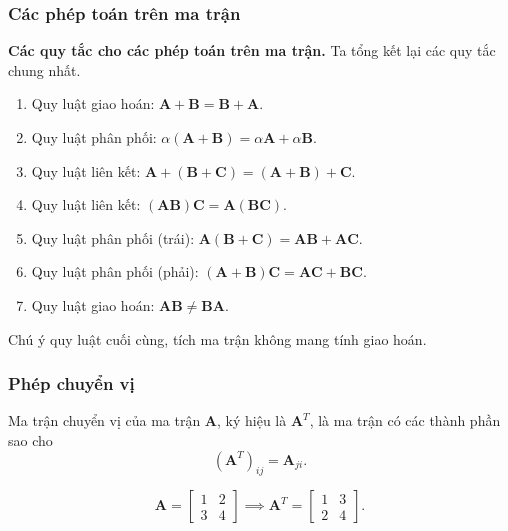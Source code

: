 \begin{frame}
    \frametitle{Các phép toán trên ma trận}
    \textbf{Các quy tắc cho các phép toán trên ma trận.} Ta tổng kết lại các quy tắc chung nhất.
    \begin{enumerate}
    \item Quy luật giao hoán: \(\mathbf{A}+\mathbf{B}=\mathbf{B}+\mathbf{A}\).
    \item Quy luật phân phối: \(\alpha(\mathbf{A}+\mathbf{B})=\alpha\mathbf{A}+\alpha\mathbf{B}\).
    \item Quy luật liên kết: \(\mathbf{A}+(\mathbf{B}+\mathbf{C})=(\mathbf{A}+\mathbf{B})+\mathbf{C}\).
    \item Quy luật liên kết: \((\mathbf{AB})\mathbf{C}=\mathbf{A}(\mathbf{BC})\).
    \item Quy luật phân phối (trái): \(\mathbf{A}(\mathbf{B}+\mathbf{C})=\mathbf{AB}+\mathbf{AC}\).
    \item Quy luật phân phối (phải): \((\mathbf{A}+\mathbf{B})\mathbf{C}=\mathbf{AC}+\mathbf{BC}\).
    \item Quy luật giao hoán: \(\mathbf{AB} \neq \mathbf{BA}\).
\end{enumerate}
Chú ý quy luật cuối cùng, tích ma trận không mang tính giao hoán.
\end{frame}
\begin{frame}
    \frametitle{Phép chuyển vị}
    \begin{tcolorbox}[colback=blue!10, colframe=blue!50!black]
        Ma trận chuyển vị của ma trận \(\mathbf{A}\), ký hiệu là \(\mathbf{A}^T\), là ma trận có các thành phần sao cho \[(\mathbf{A}^T)_{ij}=\mathbf{A}_{ji}.\]
    \end{tcolorbox}
    \[\mathbf{A}=\begin{bmatrix}
    1&2\\3&4
\end{bmatrix}\implies \mathbf{A}^T =\begin{bmatrix}
    1&3\\2&4
\end{bmatrix}.\]
\end{frame}
